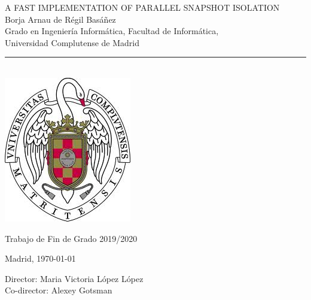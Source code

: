 \newpage
\thispagestyle{empty}
\begin{center}
   \vspace{1cm}
   {\Large A FAST IMPLEMENTATION OF PARALLEL SNAPSHOT ISOLATION}\\
   \vspace{0.5cm}
   \vspace{0.5cm}
   {\large Borja Arnau de Régil Basáñez}\\
   \vspace{0.5cm}
   Grado en Ingeniería Informática, Facultad de Informática,\\
   Universidad Complutense de Madrid \\
   \vspace{0.65cm}
   \rule{2in}{0.5pt}\\
   \vspace{0.85cm}
   \includegraphics[height=2.5in]{figures/escudo.jpg}

   \vspace{0.5cm}
   Trabajo de Fin de Grado 2019/2020
   \vspace{0.5cm}

     Madrid, \today\\
   \vspace{1cm}
\end{center}

{\raggedleft
   \vspace{1cm}
   Director: Maria Victoria López López\\
   Co-director: Alexey Gotsman\\
}
